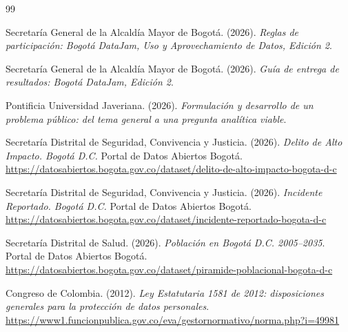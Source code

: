 \documentclass[11pt,letterpaper,oneside]{report}
\begin{document}
\begin{thebibliography}{99}

Secretaría General de la Alcaldía Mayor de Bogotá. (2026). \textit{Reglas de participación: Bogotá DataJam, Uso y Aprovechamiento de Datos, Edición 2}.

Secretaría General de la Alcaldía Mayor de Bogotá. (2026). \textit{Guía de entrega de resultados: Bogotá DataJam, Edición 2}.

Pontificia Universidad Javeriana. (2026). \textit{Formulación y desarrollo de un problema público: del tema general a una pregunta analítica viable}.

Secretaría Distrital de Seguridad, Convivencia y Justicia. (2026). \textit{Delito de Alto Impacto. Bogotá D.C.} Portal de Datos Abiertos Bogotá.\\
\url{https://datosabiertos.bogota.gov.co/dataset/delito-de-alto-impacto-bogota-d-c}

Secretaría Distrital de Seguridad, Convivencia y Justicia. (2026). \textit{Incidente Reportado. Bogotá D.C.} Portal de Datos Abiertos Bogotá.\\
\url{https://datosabiertos.bogota.gov.co/dataset/incidente-reportado-bogota-d-c}

Secretaría Distrital de Salud. (2026). \textit{Población en Bogotá D.C. 2005--2035}. Portal de Datos Abiertos Bogotá.\\
\url{https://datosabiertos.bogota.gov.co/dataset/piramide-poblacional-bogota-d-c}

Congreso de Colombia. (2012). \textit{Ley Estatutaria 1581 de 2012: disposiciones generales para la protección de datos personales}.\\
\url{https://www1.funcionpublica.gov.co/eva/gestornormativo/norma.php?i=49981}

\end{thebibliography}
\end{document}
